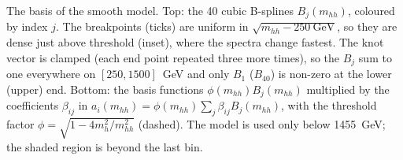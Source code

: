 \caption{The basis of the smooth model. Top: the 40 cubic B-splines $B_j(m_{hh})$, coloured by
index $j$. The breakpoints (ticks) are uniform in $\sqrt{m_{hh}-250~\mathrm{GeV}}$, so they are dense
just above threshold (inset), where the spectra change fastest. The knot vector is clamped (each end
point repeated three more times), so the $B_j$ sum to one everywhere on $[250, 1500]$~GeV and only
$B_1$ ($B_{40}$) is non-zero at the lower (upper) end. Bottom: the basis functions
$\phi(m_{hh})B_j(m_{hh})$ multiplied by the coefficients $\beta_{ij}$ in
$a_i(m_{hh}) = \phi(m_{hh})\sum_j \beta_{ij}B_j(m_{hh})$, with the threshold factor
$\phi = \sqrt{1-4m_h^2/m_{hh}^2}$ (dashed). The model is used only below 1455~GeV; the shaded
region is beyond the last bin.}
